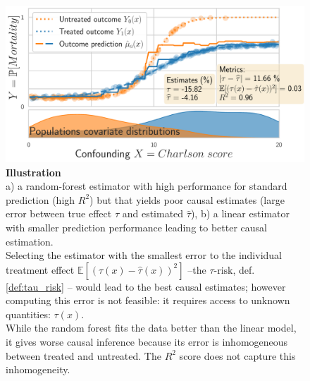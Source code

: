 \documentclass[french,12pt,twoside,a4paper]{book}
\begin{document}
\begin{figure}[t!]
  \begin{minipage}{0.32\textwidth}
    \caption[The best predictor may not estimate best causal
      effects]{\textbf{Illustration} \\a) a random-forest estimator
      with high performance for standard prediction (high $R^2$) but that
      yields poor causal estimates (large error between true effect $\tau$ and
      estimated $\hat{\tau}$), b) a linear estimator with smaller
      prediction performance leading to better causal estimation. \\[1ex]
      Selecting the estimator with the smallest error to the individual
      treatment effect $\mathbb{E}[(\tau(x) - \hat{\tau}(x))^2]$
      --the $\tau\text{-risk}$, def.\,\ref{def:tau_risk} -- would lead to
      the best causal estimates; however computing this error is not
      feasible: it requires access to unknown quantities:
      $\tau(x)$. \\[1ex]
      While the random forest fits the data better than the linear model, it
      gives worse causal inference because its error is inhomogeneous between
      treated and untreated. The $R^2$ score does not capture this
      inhomogeneity.
      \label{fig:toy_example}
    }
  \end{minipage}
  \hfill
  \begin{minipage}{0.65\textwidth}
    {\sffamily\footnotesize{}}

    \includegraphics[width=1\linewidth]{img/chapter_5/toy_random_forest_high_R2_high_tau_risk.pdf}%

    {\sffamily\footnotesize{}}


\end{minipage}
\end{figure}
\end{document}
